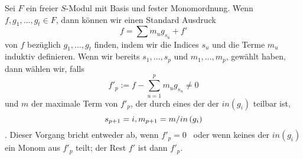 \documentclass{article}
\begin{document}
	\begin{algo}
		Sei 
		\( F \)
		ein freier 
		\( S\)-Modul
		mit Basis und fester Monomordnung.
		Wenn
		\( f,g_1,\dots,g_t \in F \),
		dann k\"onnen wir einen Standard Ausdruck
		\[
		        f=\sum m_u g_{s_u} +f'
		\]
		von
		\( f \)
		bez\"uglich 
		\( g_1,\dots,g_t \)
		finden,
		indem wir die Indices
		\( s_{u} \)
		und die Terme
		\(m_{u} \)
		induktiv definieren.
		Wenn wir bereits 
		\( s_1,\dots,s_p \)
		und
		\( m_1,\dots,m_p\),
		gew\"ahlt haben,
		dann w\"ahlen wir, 
		falls 
		\[
			f'_p:=f-\sum_{u=1}^{p} m_u g_{s_u} \neq 0
		\]
		und
		\( m \) 
		der maximale Term von 
		\(f'_p \),
		der durch eines der der
		\( in\left( g_i \right) \)
		teilbar ist,
		\[
			s_{p+1}=i , \\
			m_{p+1}=m / in\left( g_i \right)
		\].
		Dieser Vorgang bricht entweder ab, wenn 
		\( f'_p=0 \) \
		oder wenn keines der
		\( in\left( g_i \right) \) 
		ein Monom aus 
		\( f'_p\)
		teilt;
		der Rest 
		\(f'\) 
		ist dann 
		\( f'_p \).
	\end{algo}
\end{document}
